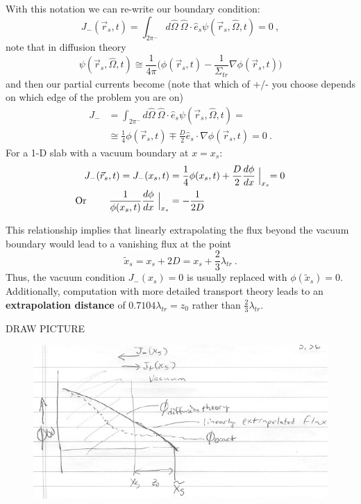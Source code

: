 \documentclass[12pt]{article}
\newcommand{\vOmega}{\ensuremath{\hat{\Omega}}}
\begin{document}
With this notation we can re-write our boundary condition:
\[J_{-}(\vec{r}_s,t) = \int_{2\pi^{-}} d\vOmega \: \vOmega \cdot \hat{e}_s \psi(\vec{r}_s, \vOmega, t) = 0 \:,\]
note that in diffusion theory
\[\psi(\vec{r}_s, \vOmega, t) \cong \frac{1}{4\pi}\bigl(\phi(\vec{r}_s, t)  -\frac{1}{\Sigma_{tr}} \nabla \phi(\vec{r}_s, t)\bigr)\]
%
and then our partial currents become (note that which of +/- you choose depends on which edge of the problem you are on)
%
\begin{align*}
J_{-} &= \int_{2\pi^{-}} d\vOmega \: \vOmega \cdot \hat{e}_s \psi(\vec{r}_s, \vOmega, t) =\\
&\cong \frac{1}{4} \phi(\vec{r}_s, t) \mp \frac{D}{2} \hat{e}_s \cdot \nabla \phi(\vec{r}_s, t) = 0\:.
\end{align*} 
%
For a 1-D slab with a vacuum boundary at $x=x_s$:
%
\begin{align*}
J_{-}(\vec{r}_s, t) = J_{-}(x_s, t) &= \frac{1}{4} \phi(x_s, t) + \frac{D}{2}\frac{d \phi}{dx}\Bigm\lvert_{x_s} = 0 \\
\text{Or } \qquad \frac{1}{\phi(x_s, t)}\frac{d \phi}{dx}\Bigm\lvert_{x_s} &= -\frac{1}{2D}
\end{align*}

This relationship implies that linearly extrapolating the flux beyond the vacuum boundary would lead to a vanishing flux at the point
\[\tilde{x}_s = x_s + 2D = x_s + \frac{2}{3}\lambda_{tr}\:.\]
%
Thus, the vacuum condition $J_{-}(x_s) = 0$ is usually replaced with $\phi(\tilde{x}_s)= 0$. Additionally, computation with more detailed transport theory leads to an \textbf{extrapolation distance} of $0.7104\lambda_{tr} = z_0$ rather than $\frac{2}{3}\lambda_{tr}$. 

DRAW PICTURE
%
\begin{figure}[h!]
\begin{center}
\includegraphics[height=3 in]{../figs/DiffusionBC}
\end{center}
\end{figure}
\end{document}
